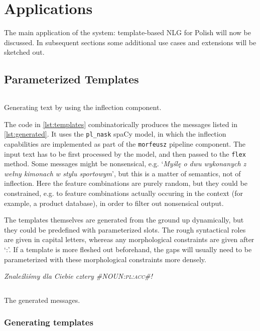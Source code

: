 \documentclass[12pt]{article}
\newcommand{\gloss}[1]{\vspace{10pt}\indent\textit{#1}\vspace{5pt}}
\newcommand{\inlinegloss}[1]{`\textit{#1}'}
\begin{document}
\section{Applications}
The main application of the system: template-based NLG for Polish will now be discussed. In subsequent sections some additional use cases and extensions will be sketched out.
\subsection{Parameterized Templates}

\begin{listing}[htbp]
\footnotesize
\inputminted[linenos,tabsize=2,breaklines]{Python}{templates_snippet.py}
\caption{Generating text by using the inflection component.}
\label{lst:generated}
\end{listing}

The code in \autoref{lst:templates} combinatorically produces the messages listed in \autoref{lst:generated}. It uses the \texttt{pl_nask} spaCy model, in which the inflection capabilities are implemented as part of the \texttt{morfeusz} pipeline component. The input text has to be first processed by the model, and then passed to the \texttt{flex} method. Some messages might be nonsensical, e.g. \inlinegloss{Myślę o dwu wykonanych z wełny kimonach w stylu sportowym}, but this is a matter of semantics, not of inflection. Here the feature combinations are purely random, but they could be constrained, e.g. to feature combinations actually occuring in the context (for example, a product database), in order to filter out nonsensical output.

The templates themselves are generated from the ground up dynamically, but they could be predefined with parameterized slots. The rough syntactical roles are given in capital letters, whereas any morphological constraints are given after `:'. If a template is more fleshed out beforehand, the gaps will usually need to be parameterized with these morphological constraints more densely.

\gloss{Znaleźliśmy dla Ciebie cztery \textsc{\#NOUN:pl:acc\#}!}

\begin{listing}[htbp]
\footnotesize
\inputminted[linenos,tabsize=2,breaklines]{Python}{filled.py}
\caption{The generated messages.}
\label{lst:templates}
\end{listing}

\subsubsection{Generating templates}
\end{document}
